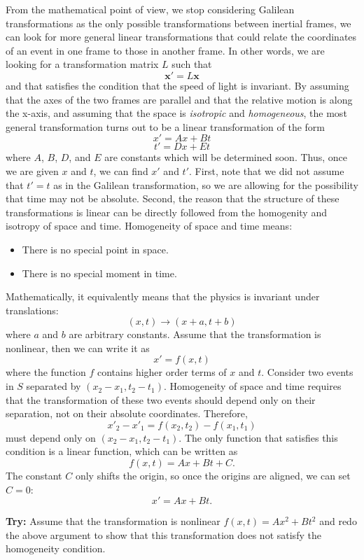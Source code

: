 \documentclass[12pt]{article}
\begin{document}
From the mathematical point of view, we stop considering Galilean transformations as the only possible transformations between inertial frames, we can look for more general linear transformations that could relate the coordinates of an event in one frame to those in another frame. In other words, we are looking for a transformation matrix $L$ such that
\[\mathbf{x'} = L\mathbf{x}
\]and that satisfies the condition that the speed of light is invariant. By assuming that the axes of the two frames are parallel and that the relative motion is along the x-axis, and assuming that the space is \textit{isotropic} and \textit{homogeneous}, the most general transformation turns out to be a linear transformation of the form
\[
x' = Ax + Bt
\]
\[t' = Dx + Et
\]
where $A$, $B$, $D$, and $E$ are constants which will be determined soon. Thus, once we are given $x$ and $t$, we can find $x'$ and $t'$. First, note that we did not assume that $t' = t$ as in the Galilean transformation, so we are allowing for the possibility that time may not be absolute. Second, the reason that the structure of these transformations is linear can be directly followed from the homogenity and isotropy of space and time. Homogeneity of space and time means:
\begin{itemize}
\item There is no special point in space.
\item There is no special moment in time.
\end{itemize}
Mathematically, it equivalently means that the physics is invariant under translations:
\[(x,t)\rightarrow (x+a, t+b)\]
where $a$ and $b$ are arbitrary constants. Assume that the transformation is nonlinear, then we can write it as
\[
x' = f(x,t)
\]
where the function $f$ contains higher order terms of $x$ and $t$. Consider two events in $S$ separated by $(x_2-x_1, t_2-t_1)$. Homogeneity of space and time requires that the transformation of these two events should depend only on their separation, not on their absolute coordinates. Therefore,
\[x'_2-x'_1 = f(x_2,t_2) - f(x_1,t_1)\]
must depend only on $(x_2-x_1, t_2-t_1)$. The only function that satisfies this condition is a linear function, which can be written as
\[f(x,t) = Ax + Bt+C.\]
The constant $C$ only shifts the origin, so once the origins are aligned, we can set $C=0$:
\[x' = Ax + Bt.
\]

\begin{tcolorbox}[colback=yellow!20, colframe=black]
\textbf{Try:} Assume that the transformation is nonlinear $f(x,t)= Ax^2 + Bt^2$ and redo the above argument to show that this transformation does not satisfy the homogeneity condition.
\end{tcolorbox}
\end{document}
